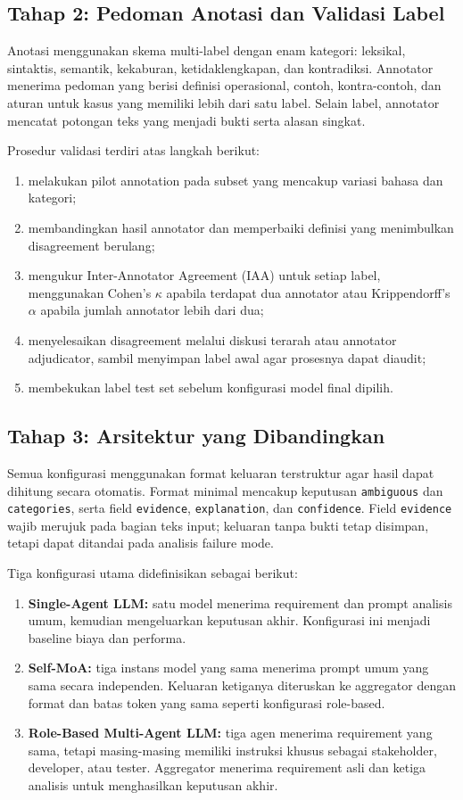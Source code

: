 \subsection{Tahap 2: Pedoman Anotasi dan Validasi Label}

Anotasi menggunakan skema multi-label dengan enam kategori: leksikal, sintaktis, semantik, kekaburan, ketidaklengkapan, dan kontradiksi. Annotator menerima pedoman yang berisi definisi operasional, contoh, kontra-contoh, dan aturan untuk kasus yang memiliki lebih dari satu label. Selain label, annotator mencatat potongan teks yang menjadi bukti serta alasan singkat.

Prosedur validasi terdiri atas langkah berikut:
\begin{enumerate}
\item melakukan pilot annotation pada subset yang mencakup variasi bahasa dan kategori;
\item membandingkan hasil annotator dan memperbaiki definisi yang menimbulkan disagreement berulang;
\item mengukur Inter-Annotator Agreement (IAA) untuk setiap label, menggunakan Cohen's $\kappa$ apabila terdapat dua annotator atau Krippendorff's $\alpha$ apabila jumlah annotator lebih dari dua;
\item menyelesaikan disagreement melalui diskusi terarah atau annotator adjudicator, sambil menyimpan label awal agar prosesnya dapat diaudit;
\item membekukan label test set sebelum konfigurasi model final dipilih.
\end{enumerate}

\subsection{Tahap 3: Arsitektur yang Dibandingkan}

Semua konfigurasi menggunakan format keluaran terstruktur agar hasil dapat dihitung secara otomatis. Format minimal mencakup keputusan \texttt{ambiguous} dan \texttt{categories}, serta field \texttt{evidence}, \texttt{explanation}, dan \texttt{confidence}. Field \texttt{evidence} wajib merujuk pada bagian teks input; keluaran tanpa bukti tetap disimpan, tetapi dapat ditandai pada analisis failure mode.

Tiga konfigurasi utama didefinisikan sebagai berikut:
\begin{enumerate}
\item \textbf{Single-Agent LLM:} satu model menerima requirement dan prompt analisis umum, kemudian mengeluarkan keputusan akhir. Konfigurasi ini menjadi baseline biaya dan performa.
\item \textbf{Self-MoA:} tiga instans model yang sama menerima prompt umum yang sama secara independen. Keluaran ketiganya diteruskan ke aggregator dengan format dan batas token yang sama seperti konfigurasi role-based.
\item \textbf{Role-Based Multi-Agent LLM:} tiga agen menerima requirement yang sama, tetapi masing-masing memiliki instruksi khusus sebagai stakeholder, developer, atau tester. Aggregator menerima requirement asli dan ketiga analisis untuk menghasilkan keputusan akhir.
\end{enumerate}

